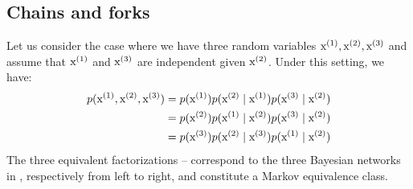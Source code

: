 \subsection{Chains and forks}
\label{sec:chains_forks}
Let us consider the case where we have three random variables ${\textnormal{x}}^{(1)}, {\textnormal{x}}^{(2)}, {\textnormal{x}}^{(3)}$ and assume that ${\textnormal{x}}^{(1)}$ and ${\textnormal{x}}^{(3)}$ are independent given ${\textnormal{x}}^{(2)}$. Under this setting, we have:
\begin{align}
    p({\textnormal{x}}^{(1)}, {\textnormal{x}}^{(2)}, {\textnormal{x}}^{(3)}) &= p({\textnormal{x}}^{(1)}) p({\textnormal{x}}^{(2)} \mid {\textnormal{x}}^{(1)}) p({\textnormal{x}}^{(3)} \mid {\textnormal{x}}^{(2)}) \label{eq:chain}\\
    &= p({\textnormal{x}}^{(2)}) p({\textnormal{x}}^{(1)} \mid {\textnormal{x}}^{(2)}) p({\textnormal{x}}^{(3)} \mid {\textnormal{x}}^{(2)}) \label{eq:fork}\\
    &= p({\textnormal{x}}^{(3)}) p({\textnormal{x}}^{(2)} \mid {\textnormal{x}}^{(3)}) p({\textnormal{x}}^{(1)} \mid {\textnormal{x}}^{(2)}) \label{eq:reversed_chain}
\end{align}
The three equivalent factorizations  --  correspond to the three Bayesian networks in , respectively from left to right, and constitute a Markov equivalence class.

